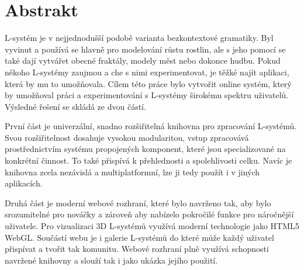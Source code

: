 
\section*{Abstrakt}

\mbox{L-systém} je v nejjednodušší podobě varianta bezkontextové gramatiky.
Byl vyvi\-nut a používá se hlavně pro modelování růstu rostlin, ale s jeho pomocí se také dají vytvářet obecné fraktály, modely měst nebo dokonce hudbu.
Pokud někoho \mbox{L-systémy} zaujmou a che s nimi experimentovat, je těžké najít aplikaci, která by mu to umožňovala.
Cílem této práce bylo vytvořit online systém, který by umožňoval práci a experimentování s L-systémy širokému spektru uživatelů.
Výsledné řešení se skládá ze dvou částí.

První část je univerzální, snadno rozšiřitelná knihovna pro zpracování \mbox{L-sys}\-témů.
Svou rozšiřitelnost dosahuje vysokou modularitou, vstup zpracovává pros\-třednic\-tvím systému propojených komponent, které jsou specializované na kon\-krét\-ní činnost.
To také přispívá k přehlednosti a spolehlivosti celku.
Navíc je knihovna zcela nezávislá a multiplatformní, lze ji tedy použít i v jiných aplikacích.

Druhá část je moderní webové rozhraní, které bylo navrženo tak, aby bylo srozumitelné pro nováčky a zároveň aby nabízelo pokročilé funkce pro nároč\-nější uživatele.
Pro vizualizaci 3D \mbox{L-systémů} využívá moderní technologie jako HTML5 WebGL.
Součástí webu je i galerie L-systémů do které může každý uživatel přispívat a tvořit tak komunitu.
Webové rozhraní plně využívá schopnosti navr\-žené knihovny a slouží tak i jako ukázka jejího použití.





























